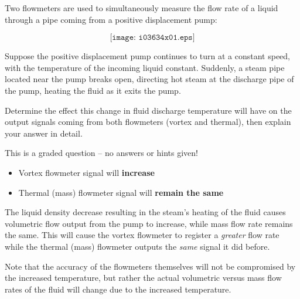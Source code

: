 

Two flowmeters are used to simultaneously measure the flow rate of a liquid through a pipe coming from a positive displacement pump:

$$\texttt{[image: i03634x01.eps]}$$

Suppose the positive displacement pump continues to turn at a constant speed, with the temperature of the incoming liquid constant.  Suddenly, a steam pipe located near the pump breaks open, directing hot steam at the discharge pipe of the pump, heating the fluid as it exits the pump.

\vskip 10pt

Determine the effect this change in fluid discharge temperature will have on the output signals coming from both flowmeters (vortex and thermal), then explain your answer in detail.

\vfil 

\eject






This is a graded question -- no answers or hints given!







\begin{itemize}
\item{} Vortex flowmeter signal will {\bf increase}
\item{} Thermal (mass) flowmeter signal will {\bf remain the same}
\end{itemize}

The liquid density decrease resulting in the steam's heating of the fluid causes volumetric flow output from the pump to increase, while mass flow rate remains the same.  This will cause the vortex flowmeter to register a {\it greater} flow rate while the thermal (mass) flowmeter outputs the {\it same} signal it did before.  

Note that the accuracy of the flowmeters themselves will not be compromised by the increased temperature, but rather the actual volumetric versus mass flow rates of the fluid will change due to the increased temperature.




